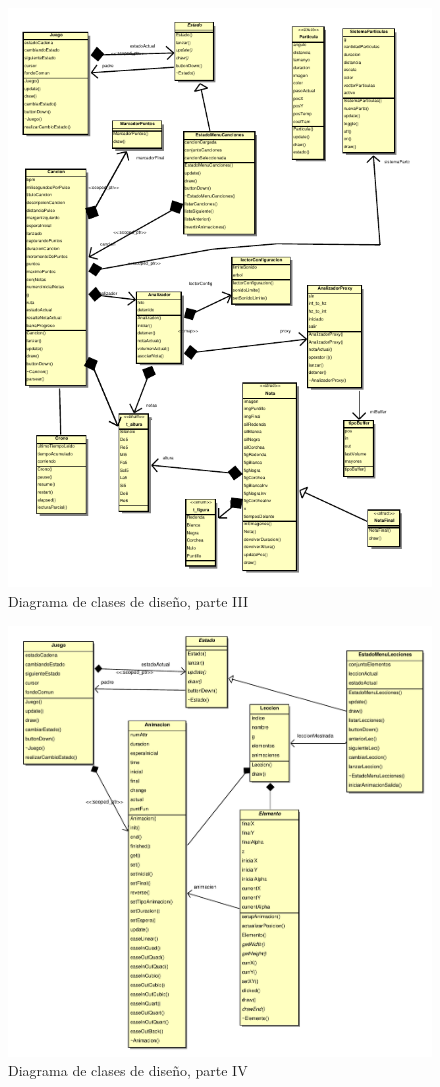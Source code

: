 \begin{figure}[htp!]
  \centering
  \includegraphics[width=\textwidth, clip=true, trim=0cm 0cm 0cm 0cm]{5_diseno/diagrama3}
  \caption{Diagrama de clases de diseño, parte III}
  \label{fig:diagrama_clases_3}
\end{figure}

\begin{figure}[htp!]
  \centering
  \includegraphics[width=\textwidth, clip=true, trim=0cm 0cm 0cm 0cm]{5_diseno/diagrama4}
  \caption{Diagrama de clases de diseño, parte IV}
  \label{fig:diagrama_clases_4}
\end{figure}

